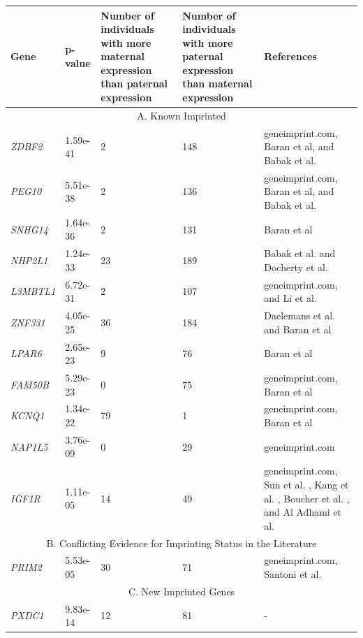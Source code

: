 \begin{table}
\centering
\begin{adjustbox}{width={\textwidth}}
\begin{tabular}{@{}p{3cm}|p{2cm}p{5cm}p{5cm}p{6cm}@{}}
\toprule Gene & p-value & Number of individuals with more maternal expression than paternal expression & Number of individuals with more paternal expression than maternal expression & References \\ \midrule
 \multicolumn{5}{c}{A. Known Imprinted}  \\ \hline
 \emph{ZDBF2} & 1.59e-41 & 2 & 148 & geneimprint.com, Baran et al\citep{Baran:2015cx}, and Babak et al.\citep{Babak2015} \\
 \emph{PEG10} & 5.51e-38 & 2 & 136 & geneimprint.com, Baran et al\citep{Baran:2015cx}, and Babak et al.\citep{Babak2015} \\
 \emph{SNHG14} & 1.64e-36 & 2 & 131 & Baran et al\citep{Baran:2015cx} \\
 \emph{NHP2L1} & 1.24e-33 & 23 & 189 & Babak et al.\citep{Babak2015}  and Docherty et al. \citep{Docherty:2014cx} \\
 \emph{L3MBTL1} & 6.72e-31 & 2 & 107 & geneimprint.com, and Li et al. \citep{Li:2004km}\\
 \emph{ZNF331} & 4.05e-25 & 36 & 184 & Daelemans et al.\citep{Daelemans:2010kc} and Baran et al\citep{Baran:2015cx} \\
 \emph{LPAR6} & 2.65e-23 & 9 & 76 & Baran et al\citep{Baran:2015cx}\\
 \emph{FAM50B} & 5.29e-23 & 0 & 75 & geneimprint.com, Baran et al\citep{Baran:2015cx}\\
 \emph{KCNQ1} & 1.34e-22 & 79 & 1 & geneimprint.com, Baran et al\citep{Baran:2015cx} \\
 \emph{NAP1L5} & 3.76e-09 & 0 & 29 & geneimprint.com \\
 \emph{IGF1R} & 1.11e-05 & 14 & 49 & geneimprint.com, Sun et al. \citep{Sun:2014eq}, Kang et al. \citep{Kang:2015ko}, Boucher et al. \citep{Boucher:2014gk}, and Al Adhami et al.\citep{AlAdhami:2015dx}\\
 \multicolumn{5}{c}{B. Conflicting Evidence for Imprinting Status in the Literature}  \\ \hline
\emph{PRIM2} & 5.53e-05 & 30 & 71 & geneimprint.com, Santoni et al. \citep{Santoni:2017hu}\\
\multicolumn{5}{c}{C. New Imprinted Genes}  \\ \hline
 \emph{PXDC1} & 9.83e-14 & 12 & 81 & - \\

\end{tabular}
\end{adjustbox}
\end{table}
